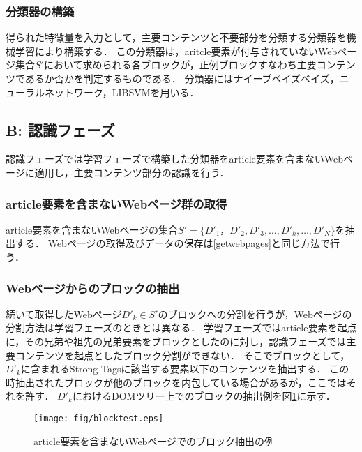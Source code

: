 \documentclass[a4paper,10pt,twocolumn]{jsarticle}
\begin{document}
\subsubsection{分類器の構築}\label{sec:constructclassifier}

得られた特徴量を入力として，主要コンテンツと不要部分を分類する分類器を機械学習により構築する．
この分類器は，aritcle要素が付与されていないWebページ集合$S'$において求められる各ブロックが，正例ブロックすなわち主要コンテンツであるか否かを判定するものである．
分類器にはナイーブベイズベイズ，ニューラルネットワーク，LIBSVMを用いる．

\subsection{B: 認識フェーズ}

認識フェーズでは学習フェーズで構築した分類器をarticle要素を含まないWebページに適用し，主要コンテンツ部分の認識を行う．

\subsubsection{article要素を含まないWebページ群の取得}

article要素を含まないWebページの集合$S'=\{D'_1，D'_2, D'_3, \dots, D'_k,\dots, D'_N\}$を抽出する．
Webページの取得及びデータの保存は\ref{getwebpages}と同じ方法で行う．

\subsubsection{Webページからのブロックの抽出}\label{sec:noarticleblockextract}

続いて取得したWebページ$D'_k \in S'$のブロックへの分割を行うが，Webページの分割方法は学習フェーズのときとは異なる．
学習フェーズではarticle要素を起点に，その兄弟や祖先の兄弟要素をブロックとしたのに対し，認識フェーズでは主要コンテンツを起点としたブロック分割ができない．
そこでブロックとして，$D'_k$に含まれるStrong Tagsに該当する要素以下のコンテンツを抽出する．
この時抽出されたブロックが他のブロックを内包している場合があるが，ここではそれを許す．
$D'_k$におけるDOMツリー上でのブロックの抽出例を図\ref{blocktest}に示す．

\begin{figure}[htbp]
\vspace{2mm}
\begin{center}
\texttt{[image: fig/blocktest.eps]}
\end{center}
\caption{article要素を含まないWebページでのブロック抽出の例}
\label{blocktest}
\end{figure}
\vspace{2mm}
\end{document}
